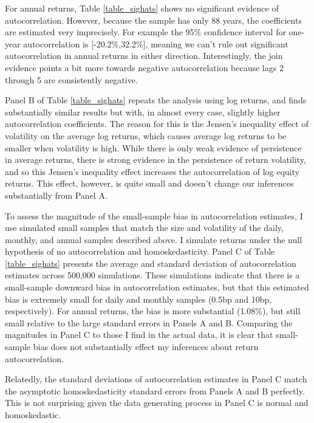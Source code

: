 \documentclass[12pt]{article}
\begin{document}
For annual returns, Table \ref{table_sighats} shows no significant evidence of autocorrelation. However, because the sample has only 88 years, the coefficients are estimated very imprecisely. For example the 95\% confidence interval for one-year autocorrelation is [-20.2\%,32.2\%], meaning we can't rule out significant autocorrelation in annual returns in either direction. Interestingly, the join evidence points a bit more towards negative autocorrelation because lags 2 through 5 are consistently negative.


Panel B of Table \ref{table_sighats} repeats the analysis using log returns, and finds substantially similar results but with, in almost every case, slightly higher autocorrelation coefficients. The reason for this is the Jensen's inequality effect of volatility on the average log returns, which causes average log returns to be smaller when volatility is high. While there is only weak evidence of persistence in average returns, there is strong evidence in the persistence of return volatility, and so this Jensen's inequality effect increases the autocorrelation of log equity returns. This effect, however, is quite small and doesn't change our inferences substantially from Panel A.


To assess the magnitude of the small-sample bias in autocorrelation estimates, I use simulated small samples that match the size and volatility of the daily, monthly, and annual samples described above. I simulate returns under the null hypothesis of no autocorrelation and homoskedasticity. Panel C of Table \ref{table_sighats} presents the average and standard deviation of autocorrelation estimates across 500,000 simulations. These simulations indicate that there is a small-sample downward bias in autocorrelation estimates, but that this estimated bias is extremely small for daily and monthly samples (0.5bp and 10bp, respectively). For annual returns, the bias is more substantial (1.08\%), but still small relative to the large standard errors in Panels A and B. Comparing the magnitudes in Panel C to those I find in the actual data, it is clear that small-sample bias does not substantially effect my inferences about return autocorrelation.

Relatedly, the standard deviations of autocorrelation estimates in Panel C match the asymptotic homoskedasticity standard errors from Panels A and B perfectly. This is not surprising given the data generating process in Panel C is normal and homoskedastic.
\end{document}
